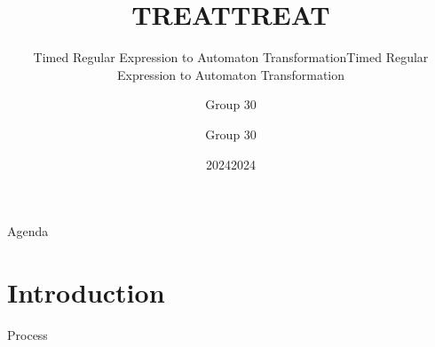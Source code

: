 \documentclass{beamer}
\title{TREAT}
\subtitle{Timed Regular Expression to Automaton Transformation}
\author{Group 30}
\institute{Aalborg Universitet}
\date{2024}
\title{TREAT}
\subtitle{Timed Regular Expression to Automaton Transformation}
\author{Group 30}
\institute{Aalborg Universitet}
\date{2024}
\begin{document}
\frame{\titlepage}

\begin{frame}{Agenda}
    \tableofcontents
\end{frame}

\section{Introduction} %
\begin{frame} {Process}

\end{frame}
\end{document}
